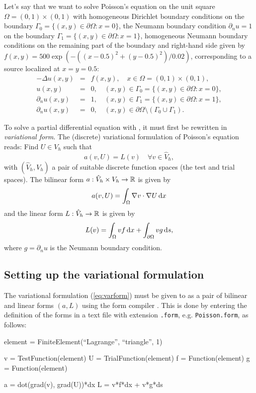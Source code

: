 Let's say that we want to solve Poisson's equation on the unit square
$\Omega = (0,1) \times (0,1)$ with homogeneous Dirichlet boundary
conditions on the boundary $\Gamma_0 = \{(x, y) \in \partial \Omega : x = 0\}$,
the Neumann boundary condition $\partial_n u = 1$ on the boundary $\Gamma_1 = \{(x, y) \in \partial \Omega : x = 1\}$,
homogeneous Neumann boundary conditions on the remaining part of the boundary
and right-hand side given by $f(x, y) = 500 \exp(-((x-0.5)^2 +
(y-0.5)^2)/0.02)$, corresponding to a source localized at $x = y = 0.5$:
\begin{eqnarray} \label{eq:poisson,quickstart}
  - \Delta u(x, y) &=& f(x, y), \quad
  x \in \Omega = (0,1) \times (0,1), \\
  u(x, y) &=& 0, \quad
  (x, y) \in \Gamma_0 = \{(x, y) \in \partial \Omega : x = 0\}, \\
  \partial_n u(x, y) &=& 1, \quad
  (x, y) \in \Gamma_1 = \{(x, y) \in \partial \Omega : x = 1\}, \\
  \partial_n u(x, y) &=& 0, \quad
  (x, y) \in \partial \Omega \setminus (\Gamma_0 \cup \Gamma_1).
\end{eqnarray}

To solve a partial differential equation with \dolfin{}, it must first
be rewritten in \emph{variational form}.  The (discrete) variational
formulation of Poisson's equation reads: Find $U \in V_h$ such that
\begin{equation} \label{eq:varform}
  a(v, U) = L(v) \quad \forall v\in \hat{V}_h, 
\end{equation}
with $(\hat{V}_h, V_h)$ a pair of suitable discrete function spaces
(the test and trial spaces). The bilinear form $a : \hat{V}_h \times V_h
\rightarrow \mathbb{R}$ is given by
\begin{equation}
  a(v, U) = \int_{\Omega} \nabla v \cdot \nabla U \, \mathrm{d}x
\end{equation}
and the linear form $L : \hat{V}_h \rightarrow \mathbb{R}$ is given by
\begin{equation}
  L(v) = \int_{\Omega} v f \, \mathrm{d}x + \int_{\partial \Omega} v g \, \mathrm{d}s,
\end{equation}
where $g = \partial_n u$ is the Neumann boundary condition.

\subsection{Setting up the variational formulation}

The variational formulation (\ref{eq:varform}) must be given to
\dolfin{} as a pair of bilinear and linear forms $(a, L)$ using the
form compiler \ffc{}. This is done by entering the definition of
the forms in a text file with extension \texttt{.form},
e.g. \texttt{Poisson.form}, as follows:
\begin{code}
  element = FiniteElement(``Lagrange'', ``triangle'', 1)

  v = TestFunction(element)
  U = TrialFunction(element)
  f = Function(element)
  g = Function(element)
  
  a = dot(grad(v), grad(U))*dx
  L = v*f*dx + v*g*ds
\end{code}

